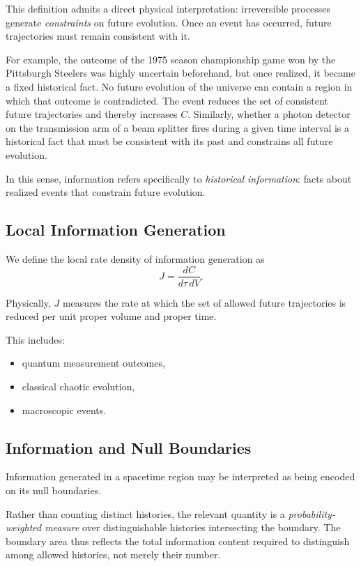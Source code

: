 \documentclass[12pt]{article}
\begin{document}
This definition admits a direct physical interpretation:
irreversible processes generate \emph{constraints} on future
evolution. Once an event has occurred, future trajectories must
remain consistent with it.

For example, the outcome of the 1975 season championship game
won by the Pittsburgh Steelers was highly uncertain beforehand,
but once realized, it became a fixed historical fact.
No future evolution of the universe can contain a region in which
that outcome is contradicted. The event reduces the set of
consistent future trajectories and thereby increases $C$.
Similarly, whether a photon detector on the transmission arm of a 
beam splitter fires during a given time interval is a 
historical fact that must be consistent 
with its past and constrains all future evolution.

In this sense, information refers specifically to
\emph{historical information}: facts about realized events that
constrain future evolution.

\subsection{Local Information Generation}

We define the local rate density of information generation as
\begin{equation}
J = \frac{dC}{d\tau\, dV}.
\end{equation}

Physically, $J$ measures the rate at which the set of allowed
future trajectories is reduced per unit proper volume and
proper time.

This includes:
\begin{itemize}
\item quantum measurement outcomes,
\item classical chaotic evolution,
\item macroscopic events.
\end{itemize}

\subsection{Information and Null Boundaries}

Information generated in a spacetime region may be interpreted as
being encoded on its null boundaries.

Rather than counting distinct histories, the relevant quantity is
a \emph{probability-weighted measure} over distinguishable
histories intersecting the boundary. The boundary area thus reflects
the total information content required to distinguish among allowed
histories, not merely their number.
\end{document}

